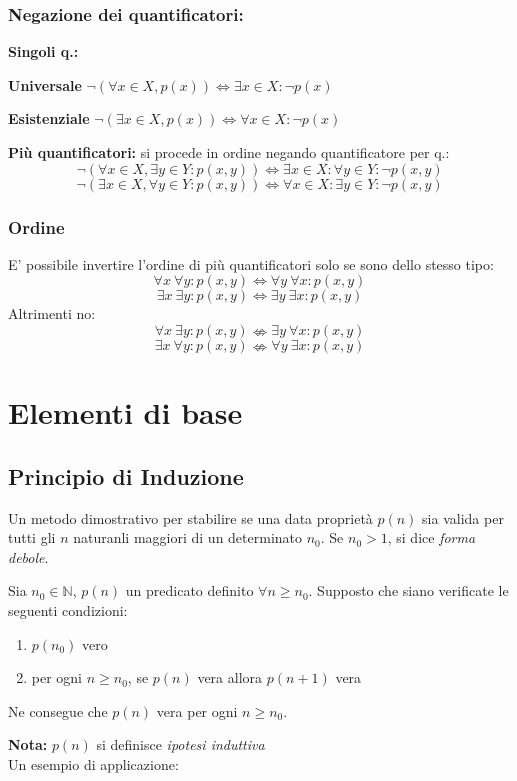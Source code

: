 \documentclass[10pt, oneside]{book}
\theoremstyle{plain}
\begin{document}
\subsection*{Negazione dei quantificatori:}
\begin{description}
\item \textbf{Singoli q.:}
   \item[$\star$] \textbf{Universale} $\neg (\forall x \in X, p(x)) \Longleftrightarrow \exists x \in X : \neg p(x)$
   \item[$\star$] \textbf{Esistenziale} $\neg (\exists x \in X, p(x)) \Longleftrightarrow \forall x \in X : \neg p(x)$
   \item \textbf{Più quantificatori:} si procede in ordine negando quantificatore per q.:
   \[\neg (\forall x \in X, \exists y \in Y : p(x,y)) \Longleftrightarrow \exists x \in X : \forall y \in Y : \neg p(x,y)\]
    \[\neg (\exists x \in X, \forall y \in Y : p(x,y)) \Longleftrightarrow \forall x \in X : \exists y \in Y : \neg p(x,y)\]
\end{description}
\subsection*{Ordine}
E' possibile invertire l'ordine di più quantificatori solo se sono dello stesso tipo:
\[\forall x {\ }\forall y : p(x,y) \Longleftrightarrow \forall y {\ }\forall x : p(x,y)\]
\[\exists x {\ }\exists y : p(x,y) \Longleftrightarrow  \exists y {\ }\exists x : p(x,y)\]
Altrimenti no:
\[\forall x {\ }\exists y : p(x,y) \nLeftrightarrow \exists y {\ }\forall x : p(x,y)\]
\[\exists x {\ }\forall y : p(x,y) \nLeftrightarrow \forall y {\ }\exists x : p(x,y)\]

\chapter{Elementi di base}
\section{Principio di Induzione}
Un metodo dimostrativo per stabilire se una data proprietà $p(n)$ sia valida per tutti gli $n$ naturanli maggiori di un determinato $n_0$. Se $n_0 > 1$, si dice \textit{forma debole}.
\begin{ther}
Sia $n_0 \in \mathbb{N}$, $p(n)$ un predicato definito $\forall n \geq n_0$. Supposto che siano verificate le seguenti condizioni:
\begin{enumerate}[label = \Roman*)]
    \item $p(n_0)$ vero
    \item per ogni $n \geq n_0$, se $p(n)$ vera allora $p(n+1)$ vera
\end{enumerate}
Ne consegue che $p(n)$ vera per ogni $n \geq n_0$.
\end{ther}
\textbf{Nota:} $p(n)$ si definisce \textit{ipotesi induttiva}
\\Un esempio di applicazione:
\end{document}
